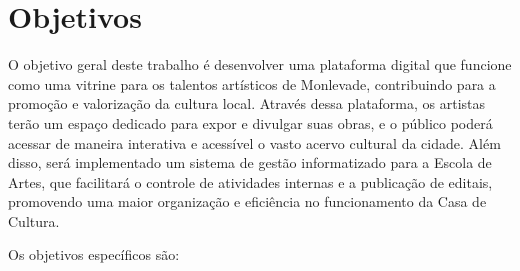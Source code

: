\section{Objetivos}
\label{sec:objetivos}

O objetivo geral deste trabalho é desenvolver uma plataforma digital que funcione como uma vitrine para os talentos artísticos de Monlevade, contribuindo para a promoção e valorização da cultura local. Através dessa plataforma, os artistas terão um espaço dedicado para expor e divulgar suas obras, e o público poderá acessar de maneira interativa e acessível o vasto acervo cultural da cidade. Além disso, será implementado um sistema de gestão informatizado para a Escola de Artes, que facilitará o controle de atividades internas e a publicação de editais, promovendo uma maior organização e eficiência no funcionamento da Casa de Cultura.

Os objetivos específicos são:

